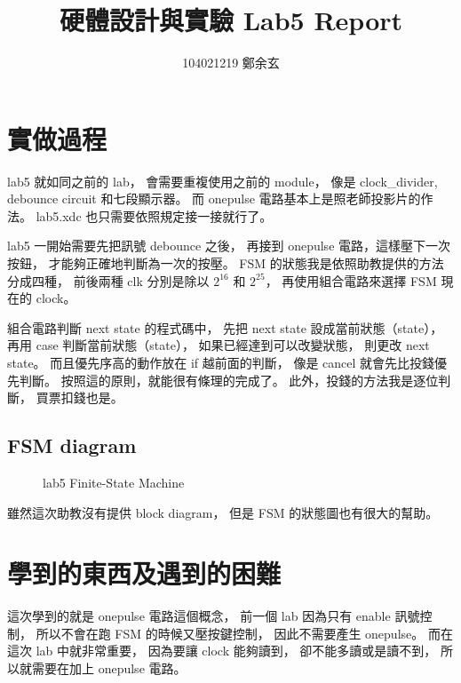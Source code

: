 \documentclass{article}
\begin{document}
\begin{CJK}{UTF8}{bsmi}
\title{硬體設計與實驗 Lab5 Report}
\author{104021219 鄭余玄}
\date{}
\maketitle
\section{實做過程}
lab5 就如同之前的 lab，
會需要重複使用之前的 module，
像是 clock\_divider, debounce circuit
和七段顯示器。
而 onepulse 電路基本上是照老師投影片的作法。
lab5.xdc 也只需要依照規定接一接就行了。

lab5 一開始需要先把訊號 debounce 之後，
再接到 onepulse 電路，這樣壓下一次按鈕，
才能夠正確地判斷為一次的按壓。
FSM 的狀態我是依照助教提供的方法分成四種，
前後兩種 clk 分別是除以 $2^{16}$ 和 $2^{25}$，
再使用組合電路來選擇 FSM 現在的 clock。

組合電路判斷 next state 的程式碼中，
先把 next state 設成當前狀態（state），
再用 case 判斷當前狀態（state），
如果已經達到可以改變狀態，
則更改 next state。
而且優先序高的動作放在 if 越前面的判斷，
像是 cancel 就會先比投錢優先判斷。
按照這的原則，就能很有條理的完成了。
此外，投錢的方法我是逐位判斷，
買票扣錢也是。
\subsection{FSM diagram}
\begin{figure}[h]
\caption{lab5 Finite-State Machine}
\end{figure}
雖然這次助教沒有提供 block diagram，
但是 FSM 的狀態圖也有很大的幫助。

\section{學到的東西及遇到的困難}
這次學到的就是 onepulse 電路這個概念，
前一個 lab 因為只有 enable 訊號控制，
所以不會在跑 FSM 的時候又壓按鍵控制，
因此不需要產生 onepulse。
而在這次 lab 中就非常重要，
因為要讓 clock 能夠讀到，
卻不能多讀或是讀不到，
所以就需要在加上 onepulse 電路。


\end{CJK}
\end{document}
